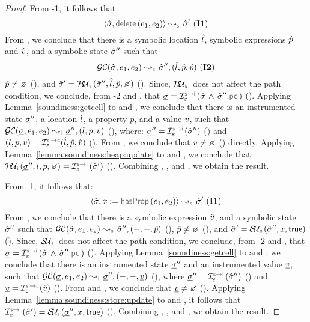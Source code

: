 \begin{proof}
\noindent {}
From \hyp{1}, it follows that 
$$\absbsemrule{\sstate, \jsildelete(\jsilexpr_1, \jsilexpr_2)}{\sstate'}{\symbolic} \text{ (\ieq{1})}$$
From , we conclude that there is a symbolic location $\hat{l}$, symbolic expressions $\hat{p}$ and $\hat{v}$, and a symbolic state $\hat{\sigma}''$ such that 
$$\absgetcellrule{\symbolic}{\sstate, \jsilexpr_1, \jsilexpr_2}{\sstate'', (\sloc, \sexprp, \sexprp)} \text{ (\ieq{2})}$$ 
$\sexprp \neq \none$ (), and  
$\sstate' = \hpupdt{\symbolic}(\sstate'', \sloc, \sexprp, \none)$ (). 
Since, $\hpupdt{\symbolic}$ does not affect the path condition, we conclude, from \hyp{2} and , that
$\istate = \interpret{\symbinst}{\senv}(\sstate \, \wedge \, \sstate''.\pcsel)$ (). 
Applying Lemma~\ref{soundiness:getcell} to  and , we conclude that
there is an instrumented state $\underline{\sigma}''$, a location $l$, a property $p$, and a value $v$, such that 
$\absgetcellrule{\instrumented}{\istate, \jsilexpr_1, \jsilexpr_2}{\istate'', (\loc, p, \val)}$ (), 
where: $\istate'' = \interpret{\symbinst}{\senv}(\sstate'')$ () and 
 $(\loc, p, \val) = \interpret{\symbconc}{\senv}(\sloc, \sexprp, \sexprv)$ (). 
From , we conclude that $\val \neq \none$ () directly. 
Applying Lemma~\ref{lemma:soundiness:heap:update} to  and , we conclude that 
$ \hpupdt{\instrumented}(\istate'', \loc, p, \none) = \interpret{\symbinst}{\senv}(\sstate')$ (). 
Combining , , and , we obtain the result. 
\vspace{5pt} 

\noindent {}
From \hyp{1}, it follows that:
$$\absbsemrule{\sstate, \jvar := \hasfield(\jsilexpr_1, \jsilexpr_2)}{\sstate'}{\symbolic} \text{ (\ieq{1})}$$ 
From , we conclude that there is a symbolic expression $\hat{v}$, and a symbolic state $\hat{\sigma}''$ such that 
$\absgetcellrule{\symbolic}{\sstate, \jsilexpr_1, \jsilexpr_2}{\sstate'', (-, -, \sexprp)}$ (), $\sexprp \neq \none$ (), 
and $\sstate' = \stupdt{\symbolic}(\sstate'', \jvar, \jtrue)$ (). 
Since, $\stupdt{\symbolic}$ does not affect the path condition, we conclude, from \hyp{2} and , that
$\istate = \interpret{\symbinst}{\senv}(\sstate \, \wedge \, \sstate''.\pcsel)$ ().
Applying Lemma~\ref{soundiness:getcell} to  and , we conclude that
there is an instrumented state $\underline{\sigma}''$ and an instrumented value $\underline{v}$, such that 
$\absgetcellrule{\instrumented}{\istate, \jsilexpr_1, \jsilexpr_2}{\istate'', (-, -, \ival)}$ (), 
where $\istate'' = \interpret{\symbinst}{\senv}(\sstate'')$ () and $\ival = \interpret{\symbconc}{\senv}(\sexprv)$ (). 
From  and , we conclude that $\ival \neq \none$ (). 
Applying Lemma~\ref{lemma:soundiness:store:update} to  and , it follows
that  $\interpret{\symbinst}{\senv}(\sstate') = \stupdt{\instrumented}(\istate'', \jvar, \jtrue)$ ().
Combining , , and , we obtain the result. 
\vspace{5pt} 


\end{proof}
